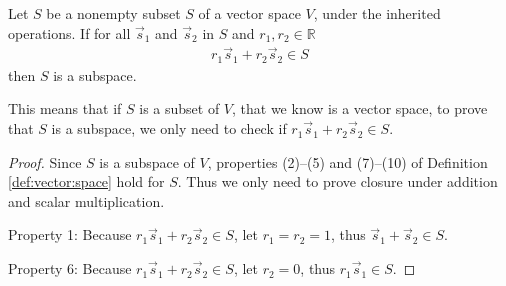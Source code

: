 \begin{lemma}
Let $S$ be a nonempty subset $S$ of a vector space $V$, under the inherited operations. 
If for all $\vec{s}_1$ and $\vec{s}_2$ in $S$ and $r_1, r_2 \in \mathbb{R}$ 
%
\begin{align*}
r_1 \vec{s}_1 + r_2 \vec{s}_2 \in S
\end{align*}
then $S$ is a subspace. 

\label{lemma:subspace}
\end{lemma}

This means that if $S$ is a subset of $V$, that we know is a vector space, to prove that $S$ is a subspace, we only need to check if $r_1 \vec{s}_1 + r_2 \vec{s}_2 \in S$. 


\begin{proof}
Since $S$ is a subspace of $V$, properties (2)--(5) and (7)--(10) of Definition \ref{def:vector:space} hold for $S$.  Thus we only need to prove closure under addition and scalar multiplication. 

Property 1:  Because $r_1 \vec{s}_1 + r_2 \vec{s}_2 \in S$, let $r_1=r_2=1$, thus $\vec{s}_1+\vec{s}_2 \in S$. 

Property 6: Because $r_1 \vec{s}_1 + r_2 \vec{s}_2 \in S$, let $r_2=0$, thus $r_1 \vec{s}_1 \in S$.  

\end{proof}


